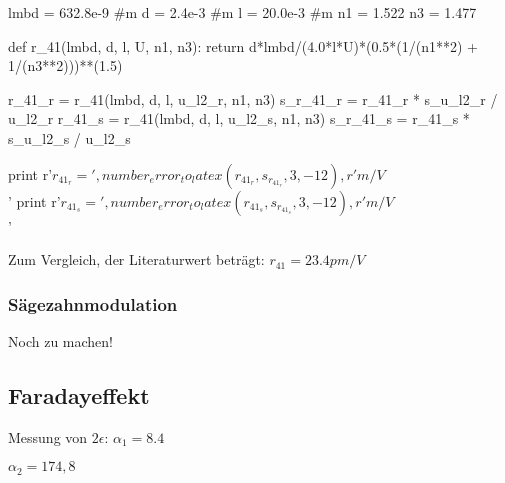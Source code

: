 \begin{python}
lmbd = 632.8e-9 #m
d = 2.4e-3 #m
l = 20.0e-3 #m
n1 = 1.522
n3 = 1.477

def r_41(lmbd, d, l, U, n1, n3):
  return d*lmbd/(4.0*l*U)*(0.5*(1/(n1**2) + 1/(n3**2)))**(1.5)

r_41_r = r_41(lmbd, d, l, u_l2_r, n1, n3)
s_r_41_r = r_41_r * s_u_l2_r / u_l2_r
r_41_s = r_41(lmbd, d, l, u_l2_s, n1, n3)
s_r_41_s = r_41_s * s_u_l2_s / u_l2_s

print r'$r_{41_r} = ', number_error_to_latex(r_41_r, s_r_41_r, 3, -12), r' m/V$\\'
print r'$r_{41_s} = ', number_error_to_latex(r_41_s, s_r_41_s, 3, -12), r' m/V$\\'


\end{python}

Zum Vergleich, der Literaturwert beträgt: $r_{41} = 23.4 pm/V$

\subsubsection{Sägezahnmodulation}

Noch zu machen!


\subsection{Faradayeffekt}

Messung von $2\epsilon$:
$\alpha_1 = 8.4$

$\alpha_2 = 174,8$

